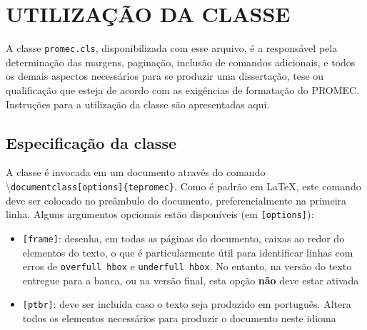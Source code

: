 \chapter{UTILIZAÇÃO DA CLASSE}
A classe \texttt{promec.cls}, disponibilizada com esse arquivo, é a responsável pela determinação das margens, paginação, inclusão de comandos adicionais, e todos os demais aspectos necessários para se produzir uma dissertação, tese ou qualificação que esteja de acordo com as exigências de formatação do PROMEC. Instruções para a utilização da classe são apresentadas aqui.

\section{Especificação da classe}\label{Sec:especificacao-classe}
A classe é invocada em um documento através do comando
\textbackslash\lstinline!documentclass[options]{tepromec}!. Como é padrão em \LaTeX, este comando deve ser colocado no preâmbulo do documento, preferencialmente na primeira linha. Alguns argumentos opcionais estão disponíveis (em \lstinline![options]!):
\begin{itemize}
    \item \lstinline![frame]!: desenha, em todas as páginas do documento, caixas ao redor do elementos do texto, o que é particularmente útil para identificar linhas com erros de \texttt{overfull hbox} e \texttt{underfull hbox}. No entanto, na versão do texto entregue para a banca, ou na versão final, esta opção \textbf{não} deve estar ativada
    \item \lstinline![ptbr]!: deve ser incluída caso o texto seja produzido em português. Altera todos os elementos necessários para produzir o documento neste idioma
\end{itemize}


